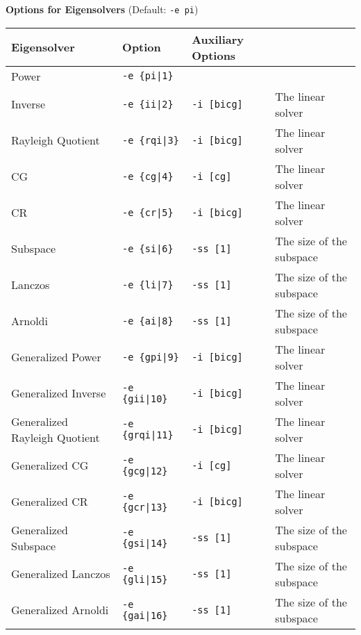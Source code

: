 \documentclass[a4paper]{article}
\begin{document}
\begin{minipage}[t]{\textwidth}
\begin{center}
{\bf Options for Eigensolvers} (Default: \verb=-e pi=) \\
\begin{tabular}{l|lll}\hline\hline
 Eigensolver      & Option              &  Auxiliary Options  & \\ \hline
\hline
 Power                             & \verb=-e {pi|1}=        &    \\ 
 Inverse                           & \verb=-e {ii|2}=        &
 \verb=-i [bicg]= & The linear solver \\
 Rayleigh Quotient                 & \verb=-e {rqi|3}=       &
 \verb=-i [bicg]= & The linear solver \\
 CG                                & \verb=-e {cg|4}=        &
 \verb=-i [cg]= & The linear solver \\ 
 CR                                & \verb=-e {cr|5}=        &
 \verb=-i [bicg]= & The linear solver \\ 
 Subspace                          & \verb=-e {si|6}=        &
 \verb=-ss [1]= & The size of the subspace \\
 Lanczos                           & \verb=-e {li|7}=        &
 \verb=-ss [1]= & The size of the subspace \\
 Arnoldi                           & \verb=-e {ai|8}=        &
 \verb=-ss [1]= & The size of the subspace \\
 Generalized Power                 & \verb=-e {gpi|9}=      &
 \verb=-i [bicg]= & The linear solver \\ 
 Generalized Inverse               & \verb=-e {gii|10}=      & 
 \verb=-i [bicg]= & The linear solver \\
 Generalized Rayleigh Quotient     & \verb=-e {grqi|11}=      & 
 \verb=-i [bicg]= & The linear solver \\ 
 Generalized CG                    & \verb=-e {gcg|12}=      & 
 \verb=-i [cg]= & The linear solver \\
 Generalized CR                    & \verb=-e {gcr|13}=      & 
 \verb=-i [bicg]= & The linear solver \\
 Generalized Subspace              & \verb=-e {gsi|14}=      &
 \verb=-ss [1]= & The size of the subspace \\
 Generalized Lanczos               & \verb=-e {gli|15}=      &
 \verb=-ss [1]= & The size of the subspace \\
 Generalized Arnoldi               & \verb=-e {gai|16}=      &
 \verb=-ss [1]= & The size of the subspace \\  
\hline         
\end{tabular}
\end{center}
\end{minipage}
\end{document}

